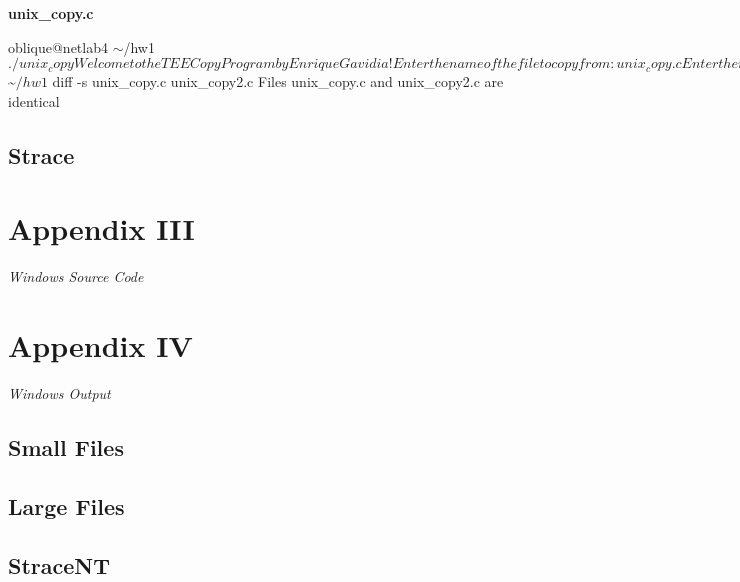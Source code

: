 \documentclass[12pt]{article}
\newcommand {\includesource}[2] {\inputminted[linenos, fontsize=\scriptsize, frame=lines]{#1}{#2}}
\newcommand {\append}[2] {\section*{Appendix #1} \textsl{\large #2}}
\newcommand {\filename}[1] {\flushleft \textbf{#1}}
\newcommand {\mytilde} {$\sim$}
\begin{document}
\filename{unix\_copy.c}
\begin{shelloutput}
oblique@netlab4 \mytilde/hw1 $ ./unix_copy
Welcome to the TEE Copy Program by Enrique Gavidia!
Enter the name of the file to copy from:
unix_copy.c
Enter the name of the file to copy to:
unix_copy2.c


oblique@netlab4 \mytilde/hw1 $ diff -s unix_copy.c unix_copy2.c
Files unix_copy.c and unix_copy2.c are identical
\end{shelloutput}

\subsection*{Strace}

\append{III} {Windows Source Code}


\append{IV} {Windows Output}
\subsection*{Small Files}
\subsection*{Large Files}
\subsection*{StraceNT}
\end{document}
